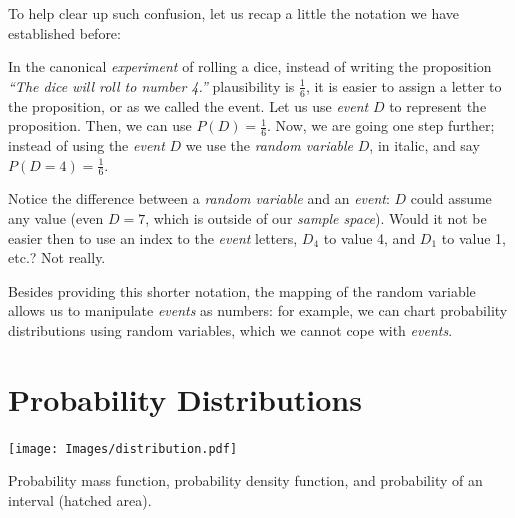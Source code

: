 \documentclass[
  letterpaper,
  12pt,
  british]{tufte-book}
\theoremstyle{plain}
\theoremstyle{definition}
\theoremstyle{plain}
\theoremstyle{remark}
\begin{document}
To help clear up such confusion, let us recap a little the notation we
have established before:

In the canonical \emph{experiment} of rolling a dice, instead of writing
the proposition \emph{``The dice will roll to number 4.''} plausibility
is \(\frac{1}{6}\), it is easier to assign a letter to the proposition,
or as we called the event. Let us use \emph{event} \(D\) to represent
the proposition. Then, we can use \(P(D)=\frac{1}{6}\). Now, we are
going one step further; instead of using the \emph{event} \(D\) we use
the \emph{random variable} \(\mathit{D}\), in italic, and say
\(P(\mathit{D}=4)=\frac{1}{6}\).

Notice the difference between a \emph{random variable} and an
\emph{event}: \(\mathit{D}\) could assume any
value (even \(\mathit{D}=7\), which is outside of our \emph{sample
space}). Would it not be easier then to use an index to the \emph{event}
letters, \(D_4\) to value 4, and \(D_1\) to value 1, etc.? Not really.

Besides providing this shorter notation, the mapping of the random
variable allows us to manipulate \emph{events} as numbers: for example,
we can chart probability distributions using random variables, which we
cannot cope with \emph{events}.

\hypertarget{probability-distributions}{%
\section{Probability Distributions}\label{probability-distributions}}

\begin{marginfigure}

{\centering \texttt{[image: Images/distribution.pdf]}

}

\caption{\label{fig-distribution}Probability mass function, probability
density function, and probability of an interval (hatched area).}

\end{marginfigure}
\end{document}
